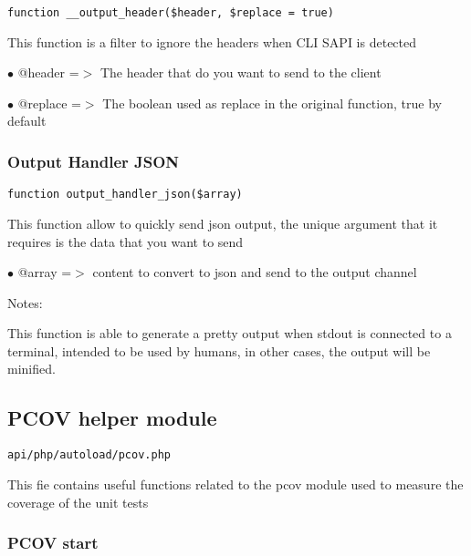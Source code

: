 \documentclass[a4paper]{article}
\begin{document}
\begin{lstlisting}
function __output_header($header, $replace = true)
\end{lstlisting}

This function is a filter to ignore the headers when CLI SAPI is detected

\begin{compactitem}
\item[\color{myblue}$\bullet$] @header  =$>$ The header that do you want to send to the client
\item[\color{myblue}$\bullet$] @replace =$>$ The boolean used as replace in the original function, true by default
\end{compactitem}

\hypertarget{toc185}{}
\subsubsection{Output Handler JSON}

\begin{lstlisting}
function output_handler_json($array)
\end{lstlisting}

This function allow to quickly send json output, the unique argument that it
requires is the data that you want to send

\begin{compactitem}
\item[\color{myblue}$\bullet$] @array =$>$ content to convert to json and send to the output channel
\end{compactitem}

Notes:

This function is able to generate a pretty output when stdout is connected to
a terminal, intended to be used by humans, in other cases, the output will be
minified.

\hypertarget{toc186}{}
\subsection{PCOV helper module}

\begin{lstlisting}
api/php/autoload/pcov.php
\end{lstlisting}

This fie contains useful functions related to the pcov module used to
measure the coverage of the unit tests

\hypertarget{toc187}{}
\subsubsection{PCOV start}
\end{document}

